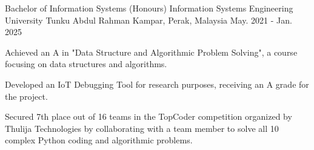 

\begin{cventries}

  \cventry
    {Bachelor of Information Systems (Honours) Information Systems Engineering} %
    {University Tunku Abdul Rahman} %
    {Kampar, Perak, Malaysia} %
    {May. 2021 - Jan. 2025} %
    {
      \begin{cvitems} %
        \item {Achieved an A in "Data Structure and Algorithmic Problem Solving", a course focusing on data structures and algorithms.}
        \item {Developed an IoT Debugging Tool for research purposes, receiving an A grade for the project.}
        \item {Secured 7th place out of 16 teams in the TopCoder competition organized by Thulija Technologies by collaborating with a team member to solve all 10 complex Python coding and algorithmic problems.}
      \end{cvitems}
    }
\end{cventries}
